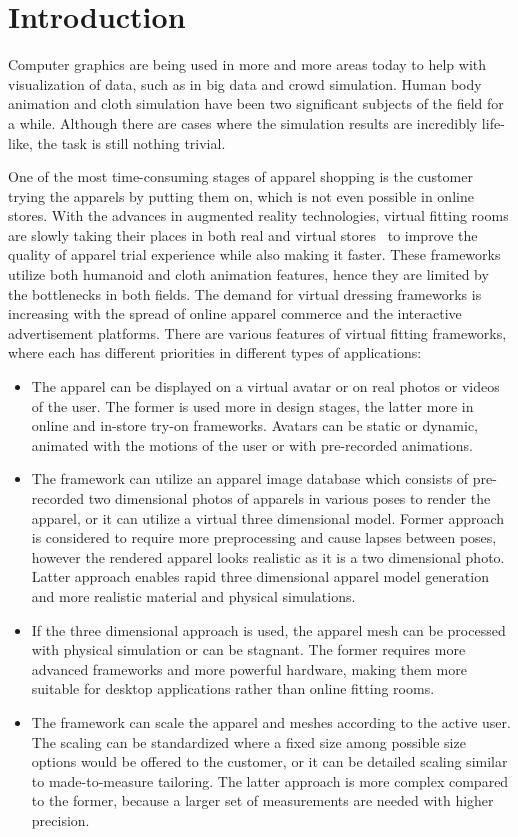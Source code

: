 \chapter{Introduction}
\label{chapter_introduction}

Computer graphics are being used in more and more areas today to help with visualization of data, such as in big data and crowd simulation. Human body animation and cloth simulation have been two significant subjects of the field for a while. Although there are cases where the simulation results are incredibly life-like, the task is still nothing trivial. 

One of the most time-consuming stages of apparel shopping is the customer trying the apparels by putting them on, which is not even possible in online stores. With the advances in augmented reality technologies, virtual fitting rooms are slowly taking their places in both real and virtual stores~\cite{Fitnect2012,Styku2013} to improve the quality of apparel trial experience while also making it faster. These frameworks utilize both humanoid and cloth animation features, hence they are limited by the bottlenecks in both fields. The demand for virtual dressing frameworks is increasing with the spread of online apparel commerce and the interactive advertisement platforms. There are various features of virtual fitting frameworks, where each has different priorities in different types of applications:

\begin{itemize}
  \item The apparel can be displayed on a virtual avatar or on real photos or videos of the user. The former is used more in design stages, the latter more in online and in-store try-on frameworks. Avatars can be static or dynamic, animated with the motions of the user or with pre-recorded animations. 
  \item The framework can utilize an apparel image database which consists of pre-recorded two dimensional photos of apparels in various poses to render the apparel, or it can utilize a virtual three dimensional model. Former approach is considered to require more preprocessing and cause lapses between poses, however the rendered apparel looks realistic as it is a two dimensional photo. Latter approach enables rapid three dimensional apparel model generation and more realistic material and physical simulations.
  \item If the three dimensional approach is used, the apparel mesh can be processed with physical simulation or can be stagnant. The former requires more advanced frameworks and more powerful hardware, making them more suitable for desktop applications rather than online fitting rooms. 
  \item The framework can scale the apparel and meshes according to the active user. The scaling can be standardized where a fixed size among possible size options would be offered to the customer, or it can be detailed scaling similar to made-to-measure tailoring. The latter approach is more complex compared to the former, because a larger set of measurements are needed with higher precision.
\end{itemize}

